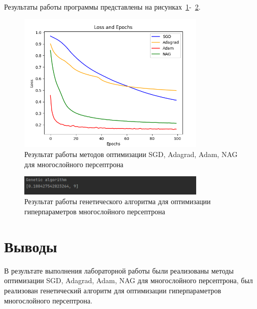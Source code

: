 \documentclass[a4paper, 14pt]{extarticle}
\begin{document}
Результаты работы программы представлены на рисунках~\ref{fig:img1}-~\ref{fig:img2}.

\begin{figure}[!htb]
	\centering
	\includegraphics[width=0.8\textwidth]{img1}
\caption{Результат работы методов оптимизации SGD, Adagrad, Adam, NAG для многослойного персептрона}
\label{fig:img1}
\end{figure}

\begin{figure}[!htb]
	\centering
	\includegraphics[width=0.8\textwidth]{img2}
\caption{Результат работы генетического алгоритма для оптимизации гиперпараметров многослойного персептрона}
\label{fig:img2}
\end{figure}

\section{Выводы}\label{Sect::conclusion}

В результате выполнения лабораторной работы были реализованы методы оптимизации SGD, Adagrad, Adam, NAG для многослойного персептрона, был реализован генетический алгоритм для оптимизации гиперпараметров многослойного персептрона.
\end{document}
